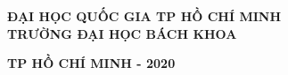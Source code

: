 \begin{titlepage}

\begin{center}

\vspace*{2\bigskipamount}

{\Large\titlefont\bfseries ĐẠI HỌC QUỐC GIA TP HỒ CHÍ MINH}\\
{\Large\titlefont\bfseries TRƯỜNG ĐẠI HỌC BÁCH KHOA}

\vspace{4cm}
{\makeatletter
\titlestyle\bfseries\LARGE\@title
\makeatother}

{\makeatletter
\ifx\@subtitle\undefined\else
    \bigskip
    \titlefont\titleshape\Large\@subtitle
\fi
\makeatother}

\vfill

{\Large\titlefont\bfseries TP HỒ CHÍ MINH - 2020}
\end{center}

\cleardoublepage
\thispagestyle{empty}


\clearpage
\thispagestyle{empty}

\end{titlepage}

